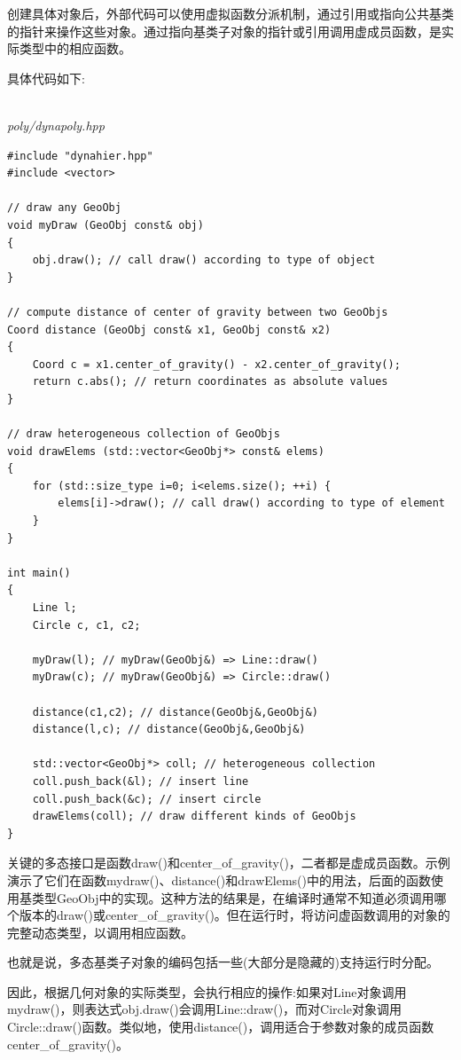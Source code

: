 创建具体对象后，外部代码可以使用虚拟函数分派机制，通过引用或指向公共基类的指针来操作这些对象。通过指向基类子对象的指针或引用调用虚成员函数，是实际类型中的相应函数。

具体代码如下:

\hspace*{\fill} \\ %
\noindent
\textit{poly/dynapoly.hpp}
\begin{lstlisting}[style=styleCXX]
#include "dynahier.hpp"
#include <vector>

// draw any GeoObj
void myDraw (GeoObj const& obj)
{
	obj.draw(); // call draw() according to type of object
}

// compute distance of center of gravity between two GeoObjs
Coord distance (GeoObj const& x1, GeoObj const& x2)
{
	Coord c = x1.center_of_gravity() - x2.center_of_gravity();
	return c.abs(); // return coordinates as absolute values
}

// draw heterogeneous collection of GeoObjs
void drawElems (std::vector<GeoObj*> const& elems)
{
	for (std::size_type i=0; i<elems.size(); ++i) {
		elems[i]->draw(); // call draw() according to type of element
	}
}

int main()
{
	Line l;
	Circle c, c1, c2;
	
	myDraw(l); // myDraw(GeoObj&) => Line::draw()
	myDraw(c); // myDraw(GeoObj&) => Circle::draw()
	
	distance(c1,c2); // distance(GeoObj&,GeoObj&)
	distance(l,c); // distance(GeoObj&,GeoObj&)
	
	std::vector<GeoObj*> coll; // heterogeneous collection
	coll.push_back(&l); // insert line
	coll.push_back(&c); // insert circle
	drawElems(coll); // draw different kinds of GeoObjs
}
\end{lstlisting}

关键的多态接口是函数draw()和center\_of\_gravity()，二者都是虚成员函数。示例演示了它们在函数mydraw()、distance()和drawElems()中的用法，后面的函数使用基类型GeoObj中的实现。这种方法的结果是，在编译时通常不知道必须调用哪个版本的draw()或center\_of\_gravity()。但在运行时，将访问虚函数调用的对象的完整动态类型，以调用相应函数。

\begin{tcolorbox}[colback=webgreen!5!white,colframe=webgreen!75!black]
\hspace*{0.75cm}也就是说，多态基类子对象的编码包括一些(大部分是隐藏的)支持运行时分配。
\end{tcolorbox}

因此，根据几何对象的实际类型，会执行相应的操作:如果对Line对象调用mydraw()，则表达式obj.draw()会调用Line::draw()，而对Circle对象调用Circle::draw()函数。类似地，使用distance()，调用适合于参数对象的成员函数center\_of\_gravity()。

